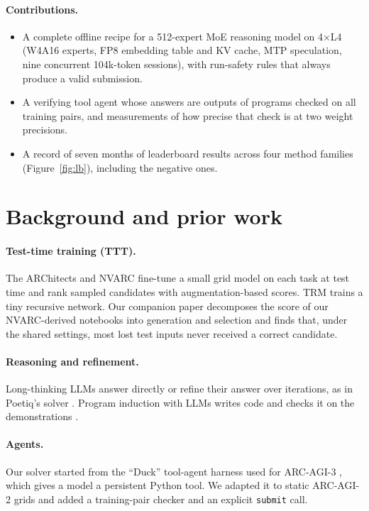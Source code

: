 \documentclass[11pt]{article}
\begin{document}
\paragraph{Contributions.}
\begin{itemize}
\item A complete offline recipe for a 512-expert MoE reasoning model on 4$\times$L4 (W4A16 experts, FP8 embedding table and KV cache, MTP speculation, nine concurrent 104k-token sessions), with run-safety rules that always produce a valid submission.
\item A verifying tool agent whose answers are outputs of programs checked on all training pairs, and measurements of how precise that check is at two weight precisions.
\item A record of seven months of leaderboard results across four method families (Figure~\ref{fig:lb}), including the negative ones.
\end{itemize}

\section{Background and prior work}
\paragraph{Test-time training (TTT).} The ARChitects \cite{architects2024} and NVARC \cite{nvarc2025} fine-tune a small grid model on each task at test time and rank sampled candidates with augmentation-based scores. TRM \cite{trm} trains a tiny recursive network. Our companion paper \cite{paper1} decomposes the score of our NVARC-derived notebooks into generation and selection and finds that, under the shared settings, most lost test inputs never received a correct candidate.
\paragraph{Reasoning and refinement.} Long-thinking LLMs answer directly or refine their answer over iterations, as in Poetiq's solver \cite{poetiq}. Program induction with LLMs writes code and checks it on the demonstrations \cite{greenblatt2024}.
\paragraph{Agents.} Our solver started from the ``Duck'' tool-agent harness used for ARC-AGI-3 \cite{duck}, which gives a model a persistent Python tool. We adapted it to static ARC-AGI-2 grids and added a training-pair checker and an explicit \texttt{submit} call.
\end{document}

